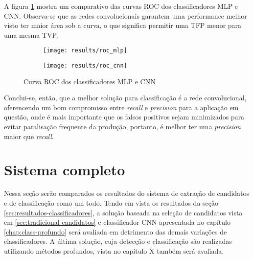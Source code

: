 A figura \ref{fig:ROC} mostra um comparativo das curvas ROC dos classificadores MLP e CNN. Observa-se que as redes convolucionais garantem uma performance melhor visto ter maior área sob a curva, o que significa permitir uma TFP menor para uma mesma TVP.

\begin{figure}[ht]
\centering
\begin{subfigure}{.5\textwidth}
  \centering
  \texttt{[image: results/roc\_mlp]}
\end{subfigure}%
\begin{subfigure}{.5\textwidth}
  \centering
  \texttt{[image: results/roc\_cnn]}
\end{subfigure}
\caption{Curva ROC dos classificadores MLP e CNN}
\label{fig:ROC}
\end{figure}

Conclui-se, então, que a melhor solução para classificação é a rede convolucional, oferencendo um bom compromisso entre \textit{recall} e \textit{precision} para a aplicação em questão, onde é mais importante que os falsos positivos sejam minimizados para evitar paralisação frequente da produção, portanto, é melhor ter uma \textit{precision} maior que \textit{recall}.

\section{Sistema completo}
Nessa seção serão comparados os resultados do sistema de extração de candidatos e de classificação como um todo. Tendo em vista os resultados da seção \ref{sec:resultados-classificadores}, a solução baseada na seleção de candidatos vista em \ref{sec:tradicional-candidatos} e classificador CNN apresentada no capítulo \ref{chap:class-profundo} será avaliada em detrimento das demais variações de classificadores. A última solução, cuja detecção e classificação são realizadas utilizando métodos profundos, vista no capítulo X também será avaliada.
